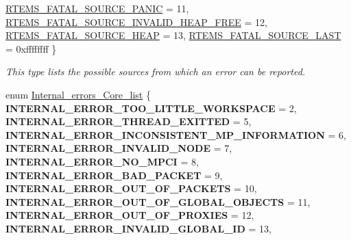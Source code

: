 \begin{DoxyCompactItemize}
\mbox{\hyperlink{group__RTEMSScoreIntErr_gga878b4de77df7d0b83d19609d4de42c26a9036ff7e1e887de6229aa5ba8f9ecfbb}{R\+T\+E\+M\+S\+\_\+\+F\+A\+T\+A\+L\+\_\+\+S\+O\+U\+R\+C\+E\+\_\+\+P\+A\+N\+IC}} = 11, 
\newline
\mbox{\hyperlink{group__RTEMSScoreIntErr_gga878b4de77df7d0b83d19609d4de42c26a1e6eca5f3e2425895a6b4d3402f93403}{R\+T\+E\+M\+S\+\_\+\+F\+A\+T\+A\+L\+\_\+\+S\+O\+U\+R\+C\+E\+\_\+\+I\+N\+V\+A\+L\+I\+D\+\_\+\+H\+E\+A\+P\+\_\+\+F\+R\+EE}} = 12, 
\mbox{\hyperlink{group__RTEMSScoreIntErr_gga878b4de77df7d0b83d19609d4de42c26ae40067d49ef6549132bf7fbc03b12501}{R\+T\+E\+M\+S\+\_\+\+F\+A\+T\+A\+L\+\_\+\+S\+O\+U\+R\+C\+E\+\_\+\+H\+E\+AP}} = 13, 
\mbox{\hyperlink{group__RTEMSScoreIntErr_gga878b4de77df7d0b83d19609d4de42c26a7fbc94edf5f4822cd70159717576e00e}{R\+T\+E\+M\+S\+\_\+\+F\+A\+T\+A\+L\+\_\+\+S\+O\+U\+R\+C\+E\+\_\+\+L\+A\+ST}} = 0xffffffff
 \}
\begin{DoxyCompactList}\small\item\em This type lists the possible sources from which an error can be reported. \end{DoxyCompactList}\item 
enum \mbox{\hyperlink{group__RTEMSScoreIntErr_ga55d1197d1b88e797ec344be41aa4f5fe}{Internal\+\_\+errors\+\_\+\+Core\+\_\+list}} \{ \newline
{\bfseries I\+N\+T\+E\+R\+N\+A\+L\+\_\+\+E\+R\+R\+O\+R\+\_\+\+T\+O\+O\+\_\+\+L\+I\+T\+T\+L\+E\+\_\+\+W\+O\+R\+K\+S\+P\+A\+CE} = 2, 
{\bfseries I\+N\+T\+E\+R\+N\+A\+L\+\_\+\+E\+R\+R\+O\+R\+\_\+\+T\+H\+R\+E\+A\+D\+\_\+\+E\+X\+I\+T\+T\+ED} = 5, 
{\bfseries I\+N\+T\+E\+R\+N\+A\+L\+\_\+\+E\+R\+R\+O\+R\+\_\+\+I\+N\+C\+O\+N\+S\+I\+S\+T\+E\+N\+T\+\_\+\+M\+P\+\_\+\+I\+N\+F\+O\+R\+M\+A\+T\+I\+ON} = 6, 
{\bfseries I\+N\+T\+E\+R\+N\+A\+L\+\_\+\+E\+R\+R\+O\+R\+\_\+\+I\+N\+V\+A\+L\+I\+D\+\_\+\+N\+O\+DE} = 7, 
\newline
{\bfseries I\+N\+T\+E\+R\+N\+A\+L\+\_\+\+E\+R\+R\+O\+R\+\_\+\+N\+O\+\_\+\+M\+P\+CI} = 8, 
{\bfseries I\+N\+T\+E\+R\+N\+A\+L\+\_\+\+E\+R\+R\+O\+R\+\_\+\+B\+A\+D\+\_\+\+P\+A\+C\+K\+ET} = 9, 
{\bfseries I\+N\+T\+E\+R\+N\+A\+L\+\_\+\+E\+R\+R\+O\+R\+\_\+\+O\+U\+T\+\_\+\+O\+F\+\_\+\+P\+A\+C\+K\+E\+TS} = 10, 
{\bfseries I\+N\+T\+E\+R\+N\+A\+L\+\_\+\+E\+R\+R\+O\+R\+\_\+\+O\+U\+T\+\_\+\+O\+F\+\_\+\+G\+L\+O\+B\+A\+L\+\_\+\+O\+B\+J\+E\+C\+TS} = 11, 
\newline
{\bfseries I\+N\+T\+E\+R\+N\+A\+L\+\_\+\+E\+R\+R\+O\+R\+\_\+\+O\+U\+T\+\_\+\+O\+F\+\_\+\+P\+R\+O\+X\+I\+ES} = 12, 
{\bfseries I\+N\+T\+E\+R\+N\+A\+L\+\_\+\+E\+R\+R\+O\+R\+\_\+\+I\+N\+V\+A\+L\+I\+D\+\_\+\+G\+L\+O\+B\+A\+L\+\_\+\+ID} = 13, 

\end{DoxyCompactItemize}
